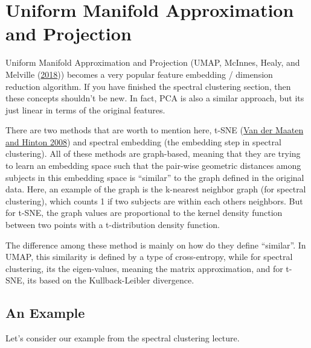 \documentclass[
]{book}
\theoremstyle{definition}
\theoremstyle{definition}
\theoremstyle{definition}
\theoremstyle{definition}
\theoremstyle{remark}
\begin{document}
\hypertarget{uniform-manifold-approximation-and-projection}{%
\chapter{Uniform Manifold Approximation and Projection}\label{uniform-manifold-approximation-and-projection}}

Uniform Manifold Approximation and Projection (UMAP, McInnes, Healy, and Melville (\protect\hyperlink{ref-mcinnes2018umap}{2018})) becomes a very popular feature embedding / dimension reduction algorithm. If you have finished the spectral clustering section, then these concepts shouldn't be new. In fact, PCA is also a similar approach, but its just linear in terms of the original features.

There are two methods that are worth to mention here, t-SNE (\protect\hyperlink{ref-van2008visualizing}{Van der Maaten and Hinton 2008}) and spectral embedding (the embedding step in spectral clustering). All of these methods are graph-based, meaning that they are trying to learn an embedding space such that the pair-wise geometric distances among subjects in this embedding space is ``similar'' to the graph defined in the original data. Here, an example of the graph is the k-nearest neighbor graph (for spectral clustering), which counts 1 if two subjects are within each others neighbors. But for t-SNE, the graph values are proportional to the kernel density function between two points with a t-distribution density function.

The difference among these method is mainly on how do they define ``similar''. In UMAP, this similarity is defined by a type of cross-entropy, while for spectral clustering, its the eigen-values, meaning the matrix approximation, and for t-SNE, its based on the Kullback-Leibler divergence.

\hypertarget{an-example-1}{%
\section{An Example}\label{an-example-1}}

Let's consider our example from the spectral clustering lecture.
\end{document}
